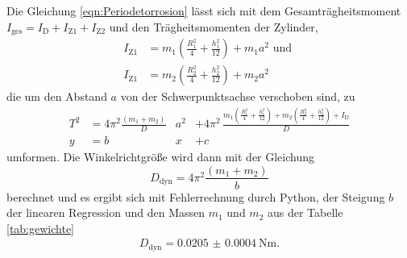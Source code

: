 Die Gleichung \eqref{eqn:Periodetorrosion} lässt sich mit dem Gesamträgheitsmoment $I_\text{ges} =
I_\text{D} + I_\text{Z1} + I_\text{Z2}$ und den Trägheitsmomenten der Zylinder,
\begin{align*}
  I_\text{Z1} &= m_1 \left(\frac{R_1^2}{4}+\frac{h_1^2}{12}\right)+m_1 a^2 \text{ und }\\
  I_\text{Z1} &= m_2 \left(\frac{R_2^2}{4}+\frac{h_2^2}{12}\right)+m_2 a^2
\end{align*}
die um den Abstand $a$ von der Schwerpunktsachse verschoben sind, zu
\begin{align}
  T^2 &= 4 \pi^2 \frac{(m_1 + m_2)}{D} & a^2 &+ 4 \pi^2 \, \frac{m_1\left(
  \frac{R_1^2}{4} + \frac{h_1^2}{12}\right) + m_2 \left(\frac{R_2^2}{4}
  +\frac{h_2^2}{12}\right)+ I_\text{D}}{D}\\
  y &= b & x & + c
  \label{eqn:ausgleichsrechnung}
\end{align}
umformen.
Die Winkelrichtgröße wird dann mit der Gleichung
\begin{equation}
  D_\text{dyn} = 4 \pi^2 \frac{(m_1 + m_2)}{b}
  \label{eqn:D_dyn}
\end{equation}
berechnet und es ergibt sich mit Fehlerrechnung durch Python, der Steigung $b$
der linearen Regression und den Massen $m_1$ und $m_2$ aus der Tabelle
\ref{tab:gewichte}
\begin{align*}
  D_\text{dyn} = \SI{0.0205(4)}{\newton\meter}.
\end{align*}

